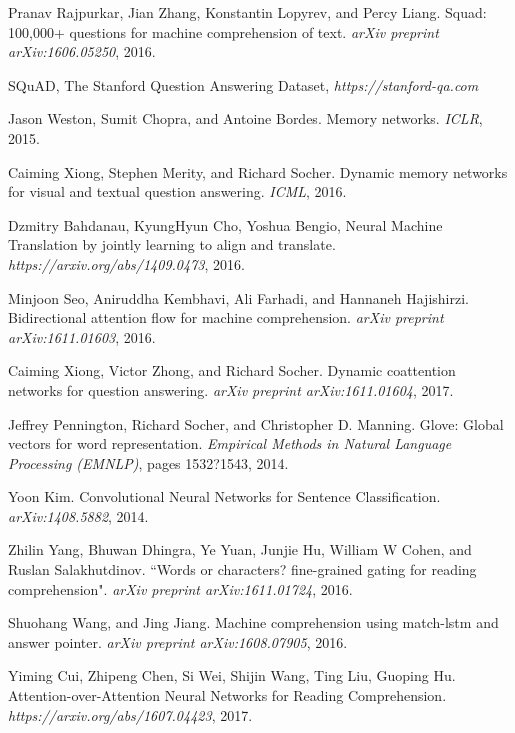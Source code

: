 \documentclass{article} %
\begin{document}
\small
\begin{thebibliography}{1}
Pranav Rajpurkar, Jian Zhang, Konstantin Lopyrev, and Percy Liang. Squad: 100,000+ questions for machine comprehension of text. {\em arXiv preprint arXiv:1606.05250}, 2016.

SQuAD, The Stanford Question Answering Dataset, {\em https://stanford-qa.com}


Jason Weston, Sumit Chopra, and Antoine Bordes. Memory networks. {\em ICLR}, 2015.

Caiming Xiong, Stephen Merity, and Richard Socher. Dynamic memory networks for visual and textual question answering. {\em ICML}, 2016.

Dzmitry Bahdanau, KyungHyun Cho, Yoshua Bengio, Neural Machine Translation by jointly learning to align and translate. {\em https://arxiv.org/abs/1409.0473}, 2016.

Minjoon Seo, Aniruddha Kembhavi, Ali Farhadi, and Hannaneh Hajishirzi. Bidirectional attention flow for machine comprehension. {\em arXiv preprint arXiv:1611.01603}, 2016.

Caiming Xiong, Victor Zhong, and Richard Socher. Dynamic coattention networks for question answering. {\em arXiv preprint arXiv:1611.01604}, 2017.

Jeffrey Pennington, Richard Socher, and Christopher D. Manning. Glove: Global vectors for word representation. {\em Empirical Methods in Natural Language Processing (EMNLP)}, pages 1532?1543, 2014.

Yoon Kim. Convolutional Neural Networks for Sentence Classification. {\em arXiv:1408.5882}, 2014.


Zhilin Yang, Bhuwan Dhingra, Ye Yuan, Junjie Hu, William W Cohen, and Ruslan Salakhutdinov. ``Words or characters? fine-grained gating for reading comprehension". {\em arXiv preprint arXiv:1611.01724}, 2016.

Shuohang Wang, and Jing Jiang. Machine comprehension using match-lstm and answer pointer. {\em arXiv preprint arXiv:1608.07905}, 2016.

Yiming Cui, Zhipeng Chen, Si Wei, Shijin Wang, Ting Liu, Guoping Hu. Attention-over-Attention Neural Networks for Reading Comprehension. {\em https://arxiv.org/abs/1607.04423}, 2017.





\end{thebibliography}
\end{document}
